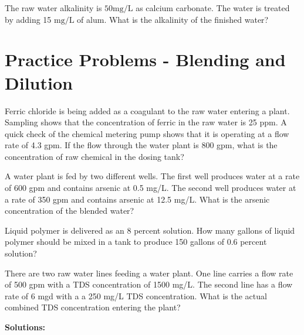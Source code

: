   The raw water alkalinity is $50 \mathrm{mg} / \mathrm{L}$ as calcium carbonate. The water is treated by adding 15 $\mathrm{mg} / \mathrm{L}$ of alum. What is the alkalinity of the finished water?



\section*{Practice Problems - Blending and Dilution}


Ferric chloride is being added as a coagulant to the raw water entering a plant. Sampling
shows that the concentration of ferric in the raw water is 25 ppm. A quick check of the chemical
metering pump shows that it is operating at a flow rate of 4.3 gpm. If the flow through the water
plant is 800 gpm, what is the concentration of raw chemical in the dosing tank?

A water plant is fed by two different wells. The first well produces water at a rate of 600
gpm and contains arsenic at 0.5 mg/L. The second well produces water at a rate of 350 gpm and
contains arsenic at 12.5 mg/L. What is the arsenic concentration of the blended water?

Liquid polymer is delivered as an 8 percent solution. How many gallons of liquid polymer
should be mixed in a tank to produce 150 gallons of 0.6 percent solution?

There are two raw water lines feeding a water plant. One line carries a flow rate of 500 gpm
with a TDS concentration of 1500 mg/L. The second line has a flow rate of 6 mgd with a a 250
mg/L TDS concentration. What is the actual combined TDS concentration entering the plant?


\textbf{Solutions:}\\


